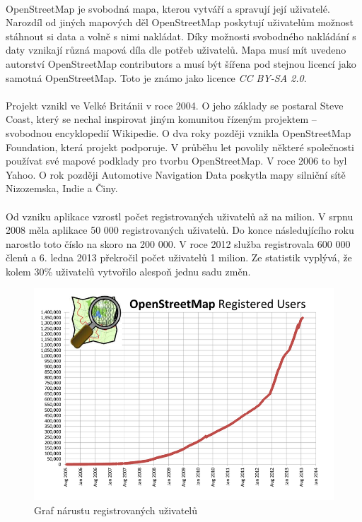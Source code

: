 \documentclass[11pt,a4paper,titlepage,oneside]{book}
\begin{document}
		\paragraph{} OpenStreetMap je svobodná mapa, kterou vytváří a spravují její uživatelé. Narozdíl od jiných mapových děl OpenStreetMap poskytují uživatelům možnost stáhnout si data a volně s nimi nakládat. Díky možnosti svobodného nakládání s daty vznikají různá mapová díla dle potřeb uživatelů. Mapa musí mít uvedeno autorství OpenStreetMap contributors a musí být šířena pod stejnou licencí jako samotná OpenStreetMap. Toto je známo jako licence \textit{CC BY-SA 2.0}\cite{creative_commons}.
		\paragraph{}Projekt vznikl ve Velké Británii v roce 2004. O jeho základy se postaral Steve Coast, který se nechal inspirovat jiným komunitou řízeným projektem -- svobodnou encyklopedií Wikipedie. O dva roky později vznikla OpenStreetMap Foundation, která projekt podporuje. V průběhu let povolily některé společnosti používat své mapové podklady pro tvorbu OpenStreetMap. V roce 2006 to byl Yahoo. O rok později Automotive Navigation Data poskytla mapy silniční sítě Nizozemska, Indie a Činy. 
		\paragraph{} Od vzniku aplikace vzrostl počet registrovaných uživatelů až na milion. V srpnu 2008 měla aplikace 50 000 registrovaných uživatelů. Do konce následujícího roku narostlo toto číslo na skoro na  200 000. V roce 2012 služba registrovala 600 000 členů a 6. ledna 2013 překročil počet uživatelů 1 milion. Ze statistik vyplývá, že kolem 30\% uživatelů vytvořilo alespoň jednu sadu změn\cite{neis}. 
		\begin{figure}[!h]
			\begin{center}
				\includegraphics[width=12cm]{obrazky/osm_stat_users.png}
				\caption{Graf nárustu registrovaných uživatelů}
			\end{center}
		\end{figure}
\end{document}
